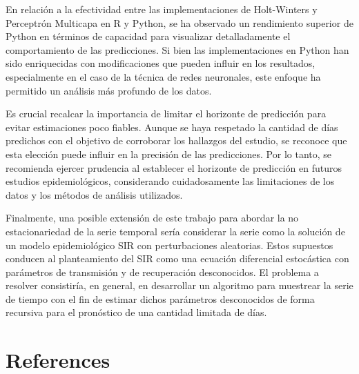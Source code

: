 \documentclass[
  us-letterpaper,
]{scrreprt}
\theoremstyle{plain}
\theoremstyle{definition}
\theoremstyle{plain}
\theoremstyle{definition}
\theoremstyle{remark}
\begin{document}
En relación a la efectividad entre las implementaciones de Holt-Winters
y Perceptrón Multicapa en R y Python, se ha observado un rendimiento
superior de Python en términos de capacidad para visualizar
detalladamente el comportamiento de las predicciones. Si bien las
implementaciones en Python han sido enriquecidas con modificaciones que
pueden influir en los resultados, especialmente en el caso de la técnica
de redes neuronales, este enfoque ha permitido un análisis más profundo
de los datos.

Es crucial recalcar la importancia de limitar el horizonte de predicción
para evitar estimaciones poco fiables. Aunque se haya respetado la
cantidad de días predichos con el objetivo de corroborar los hallazgos
del estudio, se reconoce que esta elección puede influir en la precisión
de las predicciones. Por lo tanto, se recomienda ejercer prudencia al
establecer el horizonte de predicción en futuros estudios
epidemiológicos, considerando cuidadosamente las limitaciones de los
datos y los métodos de análisis utilizados.

Finalmente, una posible extensión de este trabajo para abordar la no
estacionariedad de la serie temporal sería considerar la serie como la
solución de un modelo epidemiológico SIR con perturbaciones aleatorias.
Estos supuestos conducen al planteamiento del SIR como una ecuación
diferencial estocástica con parámetros de transmisión y de recuperación
desconocidos. El problema a resolver consistiría, en general, en
desarrollar un algoritmo para muestrear la serie de tiempo con el fin de
estimar dichos parámetros desconocidos de forma recursiva para el
pronóstico de una cantidad limitada de días.


\chapter*{References}\label{references}

\end{document}
